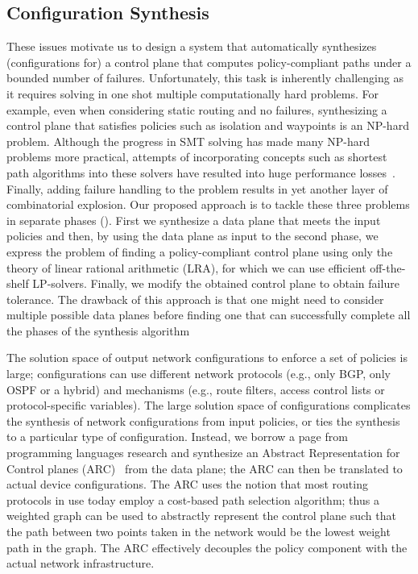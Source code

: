 \subsection{Configuration Synthesis}
These issues motivate us to design a 
system that automatically synthesizes
(configurations for) a control plane that computes policy-compliant paths
under a bounded number of failures.
Unfortunately, this task is inherently challenging as it requires solving in one shot multiple
computationally hard problems.
For example, even when considering static routing and no failures, synthesizing a control plane that satisfies  policies such as isolation and waypoints
is an NP-hard problem.
Although the progress in SMT solving has made many NP-hard problems more practical, 
attempts of incorporating concepts such as shortest path algorithms 
into these solvers have resulted into huge performance losses~\cite{monosat}. 
Finally, adding failure handling to the problem results in yet another layer of combinatorial explosion.
Our proposed approach is to tackle these three problems in separate phases
().
First we synthesize a data plane that meets the input policies and then,
by using the data plane as input to the second phase, we 
express the problem of finding a policy-compliant control plane using only the 
theory of linear rational arithmetic (LRA), for which we can use
efficient off-the-shelf LP-solvers. 
Finally, we modify the obtained control plane to obtain failure tolerance.
The drawback of this approach is that one might need to consider multiple possible
data planes before finding one that can successfully complete all the phases of the
synthesis algorithm

The solution space of output network configurations to 
enforce a set of policies
is large; configurations can use different 
network protocols (e.g., only BGP, only OSPF or a hybrid) and
mechanisms (e.g., route filters, access control lists
or protocol-specific variables). The large solution space
of configurations complicates the synthesis of
network configurations from
input policies, 
or ties the synthesis to a particular type of configuration. 
Instead, we borrow a page from programming languages
research and
synthesize an Abstract Representation for Control planes (ARC)~\cite{arc} 
from the data plane; the ARC can then be translated to actual device configurations.
The ARC uses the notion that most routing protocols in use 
today employ a cost-based path selection algorithm; thus a weighted
graph can be used to abstractly represent the control plane such that 
the path between two points taken in the network would be 
the lowest weight path in the graph. 
The ARC effectively decouples the policy component with the 
actual network infrastructure. 

